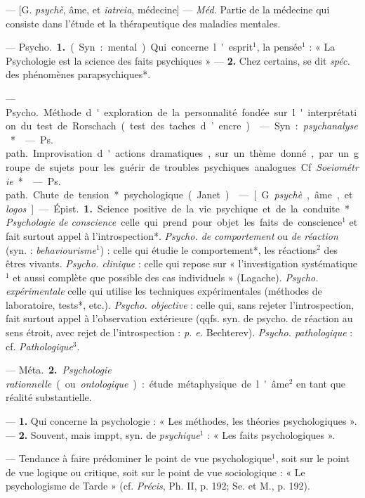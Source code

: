 \begin{itemize}[leftmargin=1cm, label=, itemsep=1pt]
 — [G. {\it psychè}, âme, et {\it iatreia}, médecine] —
\si{{\it Méd.}} Partie de la médecine qui consiste dans l'étude et la
thérapeutique des maladies mentales.

 — \si{Psycho.} {\bf 1.} (Syn. : mental). Qui concerne
l'esprit$^1$, la pensée$^1$ : « La Psychologie est la science des faits
psychiques » —  {\bf 2.} Chez certains, se dit {\it spéc.} des phénomènes
parapsychiques*.

 — \si{Psycho.} Méthode d'exploration de la
personnalité fondée sur l'interprétation du test de Rorschach (test des
taches d’encre).

 — Syn. : {\it psychanalyse}*.

 — \si{Ps. path.} Improvisation d'actions dramatiques, sur
un thème donné, par un groupe de sujets pour les guérir de troubles
psychiques analogues. Cf. {\it Soeiométrie}*.

 — \si{Ps. path.} Chute de tension* psychologique (Janet).

 — [G. {\it psychè}, âme, et {\it logos}] — \si{Épist.}
{\bf 1.} Science positive de la vie psychique et de la conduite*. {\it
Psychologie de conscience} celle qui prend pour objet les faits de
conscience$^1$ et fait surtout appel à l’introspection*. {\it Psycho. de
comportement} ou {\it de réaction} (syn. : {\it behaviourisme}$^1$) : celle
qui étudie le comportement*,
les réactions$^2$ des êtres vivants. {\it Psycho. clinique} : celle qui
repose sur « l'investigation systématique$^1$ et aussi complète que possible
des cas individuels » (Lagache). {\it Psycho. expérimentale} celle qui
utilise les techniques expérimentales (méthodes de laboratoire, tests*,
etc.). {\it Psycho. objective} : celle qui, sans rejeter l’introspection,
fait surtout appel à l'observation extérieure (qqfs. syn. de psycho. de
réaction au sens étroit, avec rejet de l’introspection : {\it p. e.}
Bechterev). {\it Psycho. pathologique} : cf. {\it Pathologique}$^3$.

— \si{Méta.} {\bf 2.} {\it Psychologie rationnelle} (ou {\it ontologique}) :
étude métaphysique de l'âme$^2$ en tant que réalité substantielle.

 — {\bf 1.} Qui concerne la psychologie : « Les méthodes,
les théories psychologiques ». — {\bf 2.} Souvent, mais imppt, syn. de {\it
psychique}$^1$ : « Les faits psychologiques ».

 —  Tendance à faire prédominer le point de
vue psychologique$^1$, soit sur le point de vue logique ou critique, soit
sur le point de vue sociologique : « Le psychologisme de Tarde » (cf.
{\it Précis}, Ph. II, p. 192; Se. et M., p. 192).


\end{itemize}
